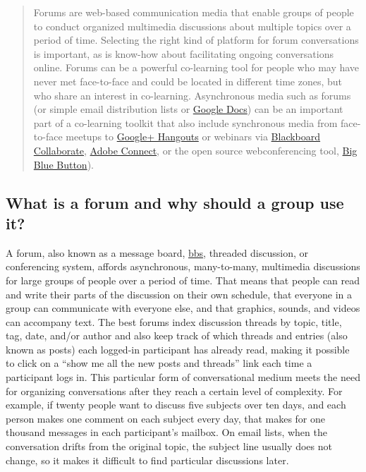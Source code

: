\begin{quote}
Forums are web-based communication media that enable groups of people to
conduct organized multimedia discussions about multiple topics over a
period of time. Selecting the right kind of platform for forum
conversations is important, as is know-how about facilitating ongoing
conversations online. Forums can be a powerful co-learning tool for
people who may have never met face-to-face and could be located in
different time zones, but who share an interest in co-learning.
Asynchronous media such as forums (or simple email distribution lists or
\href{http://www.youtube.com/watch?v=VVFbqHhkb-k}{Google Docs}) can be
an important part of a co-learning toolkit that also include synchronous
media from face-to-face meetups to
\href{http://www.google.com/+/learnmore/hangouts/}{Google+ Hangouts} or
webinars via
\href{http://www.blackboard.com/Platforms/Collaborate/Products/Blackboard-Collaborate.aspx}{Blackboard
Collaborate},
\href{http://www.adobe.com/products/adobeconnect.html}{Adobe Connect},
or the open source webconferencing tool,
\href{http://www.bigbluebutton.org/}{Big Blue Button}).
\end{quote}

\hypertarget{what-is-a-forum-and-why-should-a-group-use-it}{%
\subsection{What is a forum and why should a group use
it?}\label{what-is-a-forum-and-why-should-a-group-use-it}}

A forum, also known as a message board,
\href{http://en.wikipedia.org/wiki/Bulletin_board_system}{bbs}, threaded
discussion, or conferencing system, affords asynchronous, many-to-many,
multimedia discussions for large groups of people over a period of time.
That means that people can read and write their parts of the discussion
on their own schedule, that everyone in a group can communicate with
everyone else, and that graphics, sounds, and videos can accompany text.
The best forums index discussion threads by topic, title, tag, date,
and/or author and also keep track of which threads and entries (also
known as posts) each logged-in participant has already read, making it
possible to click on a ``show me all the new posts and threads'' link
each time a participant logs in. This particular form of conversational
medium meets the need for organizing conversations after they reach a
certain level of complexity. For example, if twenty people want to
discuss five subjects over ten days, and each person makes one comment
on each subject every day, that makes for one thousand messages in each
participant's mailbox. On email lists, when the conversation drifts from
the original topic, the subject line usually does not change, so it
makes it difficult to find particular discussions later.

